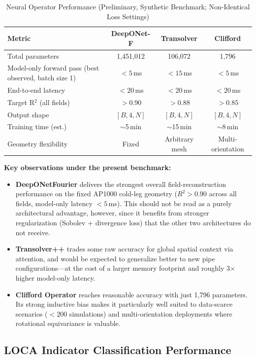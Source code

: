 \documentclass[journal]{IEEEtran}
\begin{document}
\begin{table}[htbp]
\caption{Neural Operator Performance (Preliminary, Synthetic Benchmark; Non-Identical Loss Settings)}
\label{tab:benchmark}
\centering
\begin{tabular}{lccc}
\toprule
\textbf{Metric} & \textbf{DeepONet-F} & \textbf{Transolver} & \textbf{Clifford} \\
\midrule
Total parameters & 1,451,012 & 106,072 & 1,796 \\
Model-only forward pass (best observed, batch size 1) & $< 5$\,ms & $< 15$\,ms & $< 5$\,ms \\
End-to-end latency & $< 20$\,ms & $< 20$\,ms & $< 20$\,ms \\
Target R$^2$ (all fields) & $> 0.90$ & $> 0.88$ & $> 0.85$ \\
Output shape & $[B,4,N]$ & $[B,4,N]$ & $[B,4,N]$ \\
Training time (est.) & $\sim$5\,min & $\sim$15\,min & $\sim$8\,min \\
Geometry flexibility & Fixed & Arbitrary mesh & Multi-orientation \\
\bottomrule
\end{tabular}
\end{table}

\textbf{Key observations under the present benchmark:}
\begin{itemize}
    \item \textbf{DeepONetFourier} delivers the strongest overall field-reconstruction performance on the fixed AP1000 cold-leg geometry ($R^2 > 0.90$ across all fields, model-only latency $< 5$\,ms). This should not be read as a purely architectural advantage, however, since it benefits from stronger regularization (Sobolev + divergence loss) that the other two architectures do not receive.
    \item \textbf{Transolver++} trades some raw accuracy for global spatial context via attention, and would be expected to generalize better to new pipe configurations---at the cost of a larger memory footprint and roughly 3$\times$ higher model-only latency.
    \item \textbf{Clifford Operator} reaches reasonable accuracy with just 1,796 parameters. Its strong inductive bias makes it particularly well suited to data-scarce scenarios ($< 200$ simulations) and multi-orientation deployments where rotational equivariance is valuable.
\end{itemize}

\subsection{LOCA Indicator Classification Performance}
\end{document}
